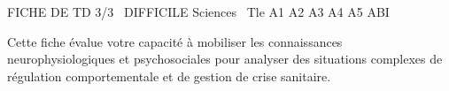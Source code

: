 \documentclass[11pt]{article}
\begin{document}
\begin{tcolorbox}[enhanced,colback=popink,colframe=popink,arc=10pt,boxrule=0pt,left=12pt,right=12pt,top=9pt,bottom=9pt]
{\color{white}\popxbold\small FICHE DE TD 3/3 \textbullet\ DIFFICILE \hfill Sciences \textbullet\ Tle A1 A2 A3 A4 A5 ABI\par}
\end{tcolorbox}
\vspace{4pt}
Cette fiche évalue votre capacité à mobiliser les connaissances neurophysiologiques et psychosociales pour analyser des situations complexes de régulation comportementale et de gestion de crise sanitaire.
\end{document}
